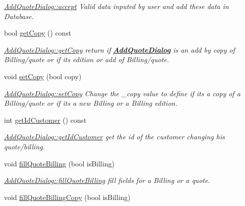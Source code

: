 \begin{DoxyCompactItemize}
\begin{DoxyCompactList}\small\item\em \hyperlink{classGui_1_1Dialogs_1_1AddQuoteDialog_abcc6fc79a513dd1765a4494d9499586b}{Add\+Quote\+Dialog\+::accept} Valid data inputed by user and add these data in Database. \end{DoxyCompactList}\item 
bool \hyperlink{classGui_1_1Dialogs_1_1AddQuoteDialog_a343bac79889747e55412d11bd2e27cbb}{get\+Copy} () const 
\begin{DoxyCompactList}\small\item\em \hyperlink{classGui_1_1Dialogs_1_1AddQuoteDialog_a343bac79889747e55412d11bd2e27cbb}{Add\+Quote\+Dialog\+::get\+Copy} return if {\bfseries \hyperlink{classGui_1_1Dialogs_1_1AddQuoteDialog}{Add\+Quote\+Dialog}} is an add by copy of Billing/quote or if it\textquotesingle{}s edition or add of Billing/quote. \end{DoxyCompactList}\item 
void \hyperlink{classGui_1_1Dialogs_1_1AddQuoteDialog_add29bc442ab7783f062b594a97fc8270}{set\+Copy} (bool copy)
\begin{DoxyCompactList}\small\item\em \hyperlink{classGui_1_1Dialogs_1_1AddQuoteDialog_add29bc442ab7783f062b594a97fc8270}{Add\+Quote\+Dialog\+::set\+Copy} Change the {\itshape \+\_\+copy} value to define if it\textquotesingle{}s a copy of a Billing/quote or if it\textquotesingle{}s a new Billing or a Billing edition. \end{DoxyCompactList}\item 
int \hyperlink{classGui_1_1Dialogs_1_1AddQuoteDialog_a66985973f98f553545a138d6abfe148b}{get\+Id\+Customer} () const 
\begin{DoxyCompactList}\small\item\em \hyperlink{classGui_1_1Dialogs_1_1AddQuoteDialog_a66985973f98f553545a138d6abfe148b}{Add\+Quote\+Dialog\+::get\+Id\+Customer} get the id of the customer changing his quote/billing. \end{DoxyCompactList}\item 
void \hyperlink{classGui_1_1Dialogs_1_1AddQuoteDialog_ac4c7b242d3340b1b03d0d5bac12b0100}{fill\+Quote\+Billing} (bool is\+Billing)
\begin{DoxyCompactList}\small\item\em \hyperlink{classGui_1_1Dialogs_1_1AddQuoteDialog_ac4c7b242d3340b1b03d0d5bac12b0100}{Add\+Quote\+Dialog\+::fill\+Quote\+Billing} fill fields for a Billing or a quote. \end{DoxyCompactList}\item 
\hypertarget{classGui_1_1Dialogs_1_1AddQuoteDialog_a3fcb23cd52dd2cd9a4b607844c4bd9cd}{}void \hyperlink{classGui_1_1Dialogs_1_1AddQuoteDialog_a3fcb23cd52dd2cd9a4b607844c4bd9cd}{fill\+Quote\+Billing\+Copy} (bool is\+Billing)\label{classGui_1_1Dialogs_1_1AddQuoteDialog_a3fcb23cd52dd2cd9a4b607844c4bd9cd}


\end{DoxyCompactItemize}
